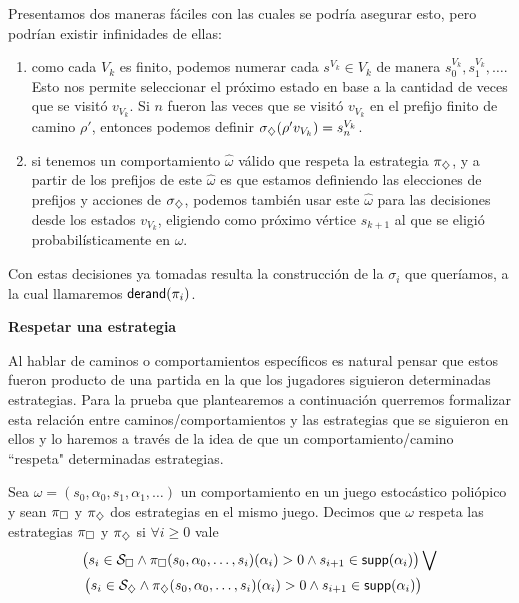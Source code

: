 \begin{boxgris}{}
	Presentamos dos maneras fáciles con las cuales se podría asegurar esto, pero
	podrían existir infinidades de ellas:
	\begin{enumerate}
		\item como cada $V_k$ es finito, podemos numerar cada $s^{V_k} \in V_k$ de manera
		      $s_0^{V_k}, s_1^{V_k}, \dots$. Esto nos permite seleccionar el próximo estado
		      en base a la cantidad de veces que se visitó $v_{V_k}$. Si $n$ fueron las veces
		      que se visitó $v_{V_k}$ en el prefijo finito de camino $\rho '$, entonces
		      podemos definir $\sigma_\diamondsuit(\rho ' v_{V_k}) = s_n^{V_k}$.
		\item si tenemos un comportamiento $\hat \omega$ válido que respeta la estrategia
		      $\pi_\diamondsuit$, y a partir de los prefijos de este $\hat \omega$ es que estamos
		      definiendo las elecciones de prefijos y acciones de $\sigma_\diamondsuit$, podemos
		      también usar este $\hat \omega$ para las decisiones desde los estados
		      $v_{V_k}$, eligiendo como próximo vértice $s_{k+1}$ al que se eligió
		      probabilísticamente en $\hat \omega$.
	\end{enumerate}
\end{boxgris}

Con estas decisiones ya tomadas resulta la construcción de la $\sigma_i$ que
queríamos, a la cual llamaremos $\textsf{derand}(\pi_i)$.

\textbf{Respetar una estrategia}

Al hablar de caminos o comportamientos específicos es natural pensar que estos
fueron producto de una partida en la que los jugadores siguieron determinadas
estrategias. Para la prueba que plantearemos a continuación querremos
formalizar esta relación entre caminos/comportamientos y las estrategias que se
siguieron en ellos y lo haremos a través de la idea de que un
comportamiento/camino ``respeta" determinadas estrategias.

Sea $\omega = (s_0, \alpha_0, s_1, \alpha_1, \dots)$ un comportamiento en un
juego estocástico poliópico y sean $\pi_\square$ y $\pi_\diamondsuit$ dos estrategias en el
mismo juego. Decimos que $\omega$ respeta las estrategias $\pi_\square$ y $\pi_\diamondsuit$
si $\forall i \geq 0$ vale
\begin{align*}
	&\bigl( s_i \in \mathcal{S}_\square \wedge \pi_\square(s_0, \alpha_0, \dots, s_i)(\alpha_i) > 0 \wedge s_{i+1} \in \textsf{supp}(\alpha_i) \bigr) \bigvee \\
	&\left(s_i \in \mathcal{S}_\diamondsuit \wedge \pi_\diamondsuit(s_0, \alpha_0, \dots, s_i)(\alpha_i) > 0 \wedge
	s_{i+1} \in \textsf{supp}(\alpha_i) \right)
\end{align*}

